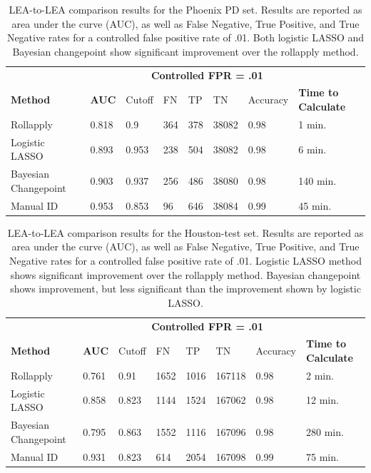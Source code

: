 \documentclass[12pt]{article}
\begin{document}
\begin{table}[]
\centering
\begin{tabular}{llllllll}
& & \multicolumn{5}{c}{\textbf{Controlled FPR = .01}} & \\
\textbf{Method} & \textbf{AUC} & Cutoff & FN &TP & TN & Accuracy & \textbf{Time to Calculate} \\ \hline
Rollapply & 0.818 &  0.9 & 364 & 378&38082 & 0.98& 1 min. \\ \hline
Logistic LASSO & 0.893 &  0.953 &238 &504 &38082 & 0.98  & 6 min. \\ \hline
Bayesian Changepoint & 0.903 &  0.937 &256 & 486&38080 & 0.98 & 140 min. \\ \hline
Manual ID & 0.953 &  0.853 & 96& 646&38084 & 0.99 & 45 min. \\ \hline 
\end{tabular}
\caption{LEA-to-LEA comparison results for the Phoenix PD set. Results are reported as area under the curve (AUC), as well as False Negative, True Positive, and True Negative rates for a controlled false positive rate of .01. Both logistic LASSO and Bayesian changepoint show significant improvement over the rollapply method.}
\label{phoenix-table}
\end{table}

\begin{table}[]
\centering
\begin{tabular}{llllllll}
& & \multicolumn{5}{c}{\textbf{Controlled FPR = .01}} & \\
\textbf{Method} & \textbf{AUC} & Cutoff & FN &TP & TN & Accuracy & \textbf{Time to Calculate} \\ \hline
Rollapply & 0.761 &  0.91 & 1652 & 1016&167118 & 0.98 & 2 min. \\ \hline
Logistic LASSO & 0.858 &  0.823 &1144 &1524 &167062 & 0.98 & 12 min. \\ \hline
Bayesian Changepoint & 0.795 &  0.863 &1552 & 1116&167096 & 0.98 & 280 min. \\ \hline
Manual ID & 0.931 &  0.823 & 614& 2054&167098 & 0.99 & 75 min. \\ \hline 
\end{tabular}
\caption{LEA-to-LEA comparison results for the Houston-test set. Results are reported as area under the curve (AUC), as well as False Negative, True Positive, and True Negative rates for a controlled false positive rate of .01. Logistic LASSO method shows significant improvement over the rollapply method. Bayesian changepoint shows improvement, but less significant than the improvement shown by logistic LASSO.}
\label{houston-table}
\end{table}
\end{document}
